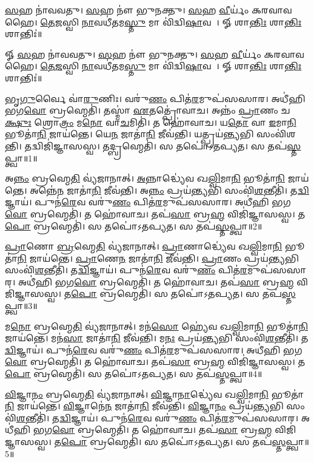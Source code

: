 \ul{𑌸}𑌹 𑌨𑌾॑𑌵𑌵𑌤𑍁। 
\ul{𑌸}𑌹 𑌨𑍗॑ 𑌭𑍁𑌨𑌕𑍍𑌤𑍁। 
\ul{𑌸}𑌹 \ul{𑌵𑍀}𑌰𑍍𑌯𑌂॑ 𑌕𑌰𑌵𑌾𑌵𑌹𑍈। 
\ul{𑌤𑍇}\ul{𑌜}𑌸𑍍𑌵𑌿 \ul{𑌨𑌾}𑌵𑌧𑍀॑𑌤𑌮\ul{𑌸𑍍𑌤𑍁} 𑌮𑌾 𑌵𑌿॑𑌦𑍍𑌵𑌿\ul{𑌷𑌾}𑌵𑌹𑍈᳚। 
𑍐 𑌶𑌾\ul{𑌨𑍍𑌤𑌿𑌃} 𑌶𑌾\ul{𑌨𑍍𑌤𑌿𑌃} 𑌶𑌾𑌨𑍍𑌤𑌿𑌃॑॥

\setcounter{anuvakam}{0}
𑍐 \ul{𑌸}𑌹 𑌨𑌾॑𑌵𑌵𑌤𑍁। 
\ul{𑌸}𑌹 𑌨𑍗॑ 𑌭𑍁𑌨𑌕𑍍𑌤𑍁। 
\ul{𑌸}𑌹 \ul{𑌵𑍀}𑌰𑍍𑌯𑌂॑ 𑌕𑌰𑌵𑌾𑌵𑌹𑍈। 
\ul{𑌤𑍇}\ul{𑌜}𑌸𑍍𑌵𑌿 \ul{𑌨𑌾}𑌵𑌧𑍀॑𑌤𑌮\ul{𑌸𑍍𑌤𑍁} 𑌮𑌾 𑌵𑌿॑𑌦𑍍𑌵𑌿\ul{𑌷𑌾}𑌵𑌹𑍈᳚। 
𑍐 𑌶𑌾\ul{𑌨𑍍𑌤𑌿𑌃} 𑌶𑌾\ul{𑌨𑍍𑌤𑌿𑌃} 𑌶𑌾𑌨𑍍𑌤𑌿𑌃॑॥


𑌭𑍃\ul{𑌗𑍁}𑌰𑍍𑌵𑍈 𑌵𑌾॑\ul{𑌰𑍁}𑌣𑌿𑌃। 
𑌵𑌰𑍁॑\ul{𑌣𑌂} 𑌪𑌿𑌤॑\ul{𑌰}𑌮𑍁𑌪॑𑌸𑌸𑌾𑌰। 
𑌅𑌧𑍀॑𑌹𑌿 𑌭𑌗\ul{𑌵𑍋} 𑌬𑍍𑌰𑌹𑍍𑌮𑍇𑌤𑌿॑। 
𑌤𑌸𑍍𑌮𑌾॑ \ul{𑌏}𑌤𑌤𑍍𑌪𑍍𑌰𑍋॑𑌵𑌾𑌚। 
𑌅𑌨𑍍𑌨𑌂॑ \ul{𑌪𑍍𑌰𑌾}𑌣𑌂 𑌚\ul{𑌕𑍍𑌷𑍁𑌃} 𑌶𑍍𑌰𑍋\ul{𑌤𑍍𑌰𑌂} 𑌮\ul{𑌨𑍋} 𑌵𑌾\ul{𑌚}𑌮𑌿𑌤𑌿॑। 
𑌤 𑌹𑍋॑𑌵𑌾𑌚। 
𑌯\ul{𑌤𑍋} 𑌵𑌾 \ul{𑌇}𑌮𑌾\ul{𑌨𑌿} 𑌭𑍂𑌤𑌾॑\ul{𑌨𑌿} 𑌜𑌾𑌯॑𑌨𑍍𑌤𑍇। 
𑌯𑍇\ul{𑌨} 𑌜𑌾𑌤𑌾॑\ul{𑌨𑌿} 𑌜𑍀𑌵॑𑌨𑍍𑌤𑌿। 
𑌯𑌤𑍍𑌪𑍍𑌰𑌯॑\ul{𑌨𑍍𑌤𑍍𑌯}𑌭𑌿 𑌸𑌂𑌵𑌿॑𑌶𑌨𑍍𑌤𑌿। 
𑌤𑌦𑍍𑌵𑌿𑌜𑌿॑𑌜𑍍𑌞𑌾𑌸𑌸𑍍𑌵। 
𑌤𑌦𑍍𑌬𑍍𑌰𑌹𑍍𑌮𑍇𑌤𑌿॑। 
𑌸 𑌤𑌪𑍋॑𑌽𑌤𑌪𑍍𑌯𑌤। 
𑌸 𑌤𑌪॑\ul{𑌸𑍍𑌤}𑌪𑍍𑌤𑍍𑌵𑌾॥1॥

𑌅\ul{𑌨𑍍𑌨𑌂} 𑌬𑍍𑌰𑌹𑍍𑌮𑍇\ul{𑌤𑌿} 𑌵𑍍𑌯॑𑌜𑌾𑌨𑌾𑌤𑍍। 
\ul{𑌅}𑌨𑍍𑌨𑌾𑌦𑍍𑌧𑍍𑌯𑍇॑𑌵 𑌖\ul{𑌲𑍍𑌵𑌿}𑌮𑌾\ul{𑌨𑌿} 𑌭𑍂𑌤𑌾॑\ul{𑌨𑌿} 𑌜𑌾𑌯॑𑌨𑍍𑌤𑍇। 
𑌅𑌨𑍍𑌨𑍇॑\ul{𑌨} 𑌜𑌾𑌤𑌾॑\ul{𑌨𑌿} 𑌜𑍀𑌵॑𑌨𑍍𑌤𑌿। 
𑌅\ul{𑌨𑍍𑌨𑌂} 𑌪𑍍𑌰𑌯॑\ul{𑌨𑍍𑌤𑍍𑌯}𑌭𑌿 𑌸𑌂𑌵𑌿॑\ul{𑌶}𑌨𑍍𑌤𑍀𑌤𑌿॑। 
𑌤\ul{𑌦𑍍𑌵𑌿}𑌜𑍍𑌞𑌾𑌯॑। 
𑌪𑍁𑌨॑\ul{𑌰𑍇}𑌵 𑌵𑌰𑍁॑\ul{𑌣𑌂} 𑌪𑌿𑌤॑\ul{𑌰}𑌮𑍁𑌪॑𑌸𑌸𑌾𑌰। 
𑌅𑌧𑍀॑𑌹𑌿 𑌭𑌗\ul{𑌵𑍋} 𑌬𑍍𑌰𑌹𑍍𑌮𑍇𑌤𑌿॑। 
𑌤 𑌹𑍋॑𑌵𑌾𑌚। 
𑌤𑌪॑\ul{𑌸𑌾} 𑌬𑍍𑌰\ul{𑌹𑍍𑌮} 𑌵𑌿𑌜𑌿॑𑌜𑍍𑌞𑌾𑌸𑌸𑍍𑌵। 
𑌤\ul{𑌪𑍋} 𑌬𑍍𑌰𑌹𑍍𑌮𑍇𑌤𑌿॑। 
𑌸 𑌤𑌪𑍋॑𑌽𑌤𑌪𑍍𑌯𑌤। 
𑌸 𑌤𑌪॑\ul{𑌸𑍍𑌤}𑌪𑍍𑌤𑍍𑌵𑌾॥2॥

\ul{𑌪𑍍𑌰𑌾}𑌣𑍋 \ul{𑌬𑍍𑌰}𑌹𑍍𑌮𑍇\ul{𑌤𑌿} 𑌵𑍍𑌯॑𑌜𑌾𑌨𑌾𑌤𑍍। 
\ul{𑌪𑍍𑌰𑌾}𑌣𑌾𑌦𑍍𑌧𑍍𑌯𑍇॑𑌵 𑌖\ul{𑌲𑍍𑌵𑌿}𑌮𑌾\ul{𑌨𑌿} 𑌭𑍂𑌤𑌾॑\ul{𑌨𑌿} 𑌜𑌾𑌯॑𑌨𑍍𑌤𑍇। 
\ul{𑌪𑍍𑌰𑌾}𑌣𑍇\ul{𑌨} 𑌜𑌾𑌤𑌾॑\ul{𑌨𑌿} 𑌜𑍀𑌵॑𑌨𑍍𑌤𑌿। 
\ul{𑌪𑍍𑌰𑌾}𑌣𑌂 𑌪𑍍𑌰𑌯॑\ul{𑌨𑍍𑌤𑍍𑌯}𑌭𑌿 𑌸𑌂𑌵𑌿॑\ul{𑌶}𑌨𑍍𑌤𑍀𑌤𑌿॑। 
𑌤\ul{𑌦𑍍𑌵𑌿}𑌜𑍍𑌞𑌾𑌯॑। 
𑌪𑍁𑌨॑\ul{𑌰𑍇}𑌵 𑌵𑌰𑍁॑\ul{𑌣𑌂} 𑌪𑌿𑌤॑\ul{𑌰}𑌮𑍁𑌪॑𑌸𑌸𑌾𑌰। 
𑌅𑌧𑍀॑𑌹𑌿 𑌭𑌗\ul{𑌵𑍋} 𑌬𑍍𑌰𑌹𑍍𑌮𑍇𑌤𑌿॑। 
𑌤 𑌹𑍋॑𑌵𑌾𑌚। 
𑌤𑌪॑\ul{𑌸𑌾} 𑌬𑍍𑌰\ul{𑌹𑍍𑌮} 𑌵𑌿𑌜𑌿॑𑌜𑍍𑌞𑌾𑌸𑌸𑍍𑌵। 
𑌤\ul{𑌪𑍋} 𑌬𑍍𑌰𑌹𑍍𑌮𑍇𑌤𑌿॑। 
𑌸 𑌤𑌪𑍋॑𑌽𑌤𑌪𑍍𑌯𑌤। 
𑌸 𑌤𑌪॑\ul{𑌸𑍍𑌤}𑌪𑍍𑌤𑍍𑌵𑌾॥3॥

𑌮\ul{𑌨𑍋} 𑌬𑍍𑌰𑌹𑍍𑌮𑍇\ul{𑌤𑌿} 𑌵𑍍𑌯॑𑌜𑌾𑌨𑌾𑌤𑍍। 
𑌮𑌨॑\ul{𑌸𑍋} 𑌹𑍍𑌯𑍇॑𑌵 𑌖\ul{𑌲𑍍𑌵𑌿}𑌮𑌾\ul{𑌨𑌿} 𑌭𑍂𑌤𑌾॑\ul{𑌨𑌿} 𑌜𑌾𑌯॑𑌨𑍍𑌤𑍇। 
𑌮𑌨॑\ul{𑌸𑌾} 𑌜𑌾𑌤𑌾॑\ul{𑌨𑌿} 𑌜𑍀𑌵॑𑌨𑍍𑌤𑌿। 
𑌮\ul{𑌨𑌃} 𑌪𑍍𑌰𑌯॑\ul{𑌨𑍍𑌤𑍍𑌯}𑌭𑌿 𑌸𑌂𑌵𑌿॑\ul{𑌶}𑌨𑍍𑌤𑍀𑌤𑌿॑। 
𑌤\ul{𑌦𑍍𑌵𑌿}𑌜𑍍𑌞𑌾𑌯॑। 
𑌪𑍁𑌨॑\ul{𑌰𑍇}𑌵 𑌵𑌰𑍁॑\ul{𑌣𑌂} 𑌪𑌿𑌤॑\ul{𑌰}𑌮𑍁𑌪॑𑌸𑌸𑌾𑌰। 
𑌅𑌧𑍀॑𑌹𑌿 𑌭𑌗\ul{𑌵𑍋} 𑌬𑍍𑌰𑌹𑍍𑌮𑍇𑌤𑌿॑। 
𑌤 𑌹𑍋॑𑌵𑌾𑌚। 
𑌤𑌪॑\ul{𑌸𑌾} 𑌬𑍍𑌰\ul{𑌹𑍍𑌮} 𑌵𑌿𑌜𑌿॑𑌜𑍍𑌞𑌾𑌸𑌸𑍍𑌵। 
𑌤\ul{𑌪𑍋} 𑌬𑍍𑌰𑌹𑍍𑌮𑍇𑌤𑌿॑। 
𑌸 𑌤𑌪𑍋॑𑌽𑌤𑌪𑍍𑌯𑌤। 
𑌸 𑌤𑌪॑\ul{𑌸𑍍𑌤}𑌪𑍍𑌤𑍍𑌵𑌾॥4॥

\ul{𑌵𑌿}𑌜𑍍𑌞𑌾\ul{𑌨𑌂} 𑌬𑍍𑌰𑌹𑍍𑌮𑍇\ul{𑌤𑌿} 𑌵𑍍𑌯॑𑌜𑌾𑌨𑌾𑌤𑍍। 
\ul{𑌵𑌿}𑌜𑍍𑌞𑌾\ul{𑌨𑌾}𑌦𑍍𑌧𑍍𑌯𑍇॑𑌵 𑌖\ul{𑌲𑍍𑌵𑌿}𑌮𑌾\ul{𑌨𑌿} 𑌭𑍂𑌤𑌾॑\ul{𑌨𑌿} 𑌜𑌾𑌯॑𑌨𑍍𑌤𑍇। 
\ul{𑌵𑌿}𑌜𑍍𑌞𑌾𑌨𑍇॑\ul{𑌨} 𑌜𑌾𑌤𑌾॑\ul{𑌨𑌿} 𑌜𑍀𑌵॑𑌨𑍍𑌤𑌿। 
\ul{𑌵𑌿}𑌜𑍍𑌞𑌾\ul{𑌨𑌂} 𑌪𑍍𑌰𑌯॑\ul{𑌨𑍍𑌤𑍍𑌯}𑌭𑌿 𑌸𑌂𑌵𑌿॑\ul{𑌶}𑌨𑍍𑌤𑍀𑌤𑌿॑। 
𑌤\ul{𑌦𑍍𑌵𑌿}𑌜𑍍𑌞𑌾𑌯॑। 
𑌪𑍁𑌨॑\ul{𑌰𑍇}𑌵 𑌵𑌰𑍁॑\ul{𑌣𑌂} 𑌪𑌿𑌤॑\ul{𑌰}𑌮𑍁𑌪॑𑌸𑌸𑌾𑌰। 
𑌅𑌧𑍀॑𑌹𑌿 𑌭𑌗\ul{𑌵𑍋} 𑌬𑍍𑌰𑌹𑍍𑌮𑍇𑌤𑌿॑। 
𑌤 𑌹𑍋॑𑌵𑌾𑌚। 
𑌤𑌪॑\ul{𑌸𑌾} 𑌬𑍍𑌰\ul{𑌹𑍍𑌮} 𑌵𑌿𑌜𑌿॑𑌜𑍍𑌞𑌾𑌸𑌸𑍍𑌵। 
𑌤\ul{𑌪𑍋} 𑌬𑍍𑌰𑌹𑍍𑌮𑍇𑌤𑌿॑। 
𑌸 𑌤𑌪𑍋॑𑌽𑌤𑌪𑍍𑌯𑌤। 
𑌸 𑌤𑌪॑\ul{𑌸𑍍𑌤}𑌪𑍍𑌤𑍍𑌵𑌾॥5॥

